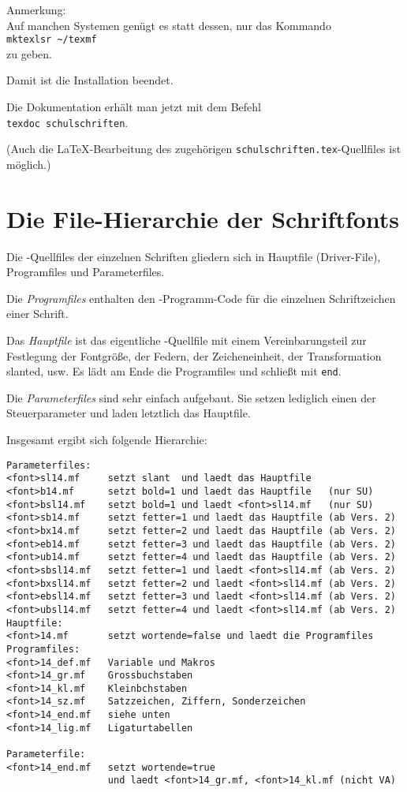 \documentclass[12pt,titlepage]{article}
\begin{document}
Anmerkung:\\
Auf manchen Systemen gen\"ugt es statt dessen, nur das Kommando\\
\verb+mktexlsr ~/texmf+\\
zu geben.

Damit ist die Installation beendet.

Die Dokumentation erh\"alt man jetzt mit dem Befehl\\
\verb+texdoc schulschriften+.

(Auch die \LaTeX-Bearbeitung des zugeh\"origen
\verb+schulschriften.tex+-Quellfiles 
ist m\"oglich.)

\section{Die File-Hierarchie der Schriftfonts}
Die \MF-Quellfiles der einzelnen Schriften gliedern sich in
Hauptfile (Driver-File), Programfiles und
Parameterfiles.

Die \emph{Programfiles} enthalten den \MF-Programm-Code
f\"ur die einzelnen Schriftzeichen einer Schrift.

Das \emph{Hauptfile} ist das eigentliche \MF-Quellfile mit
einem Vereinbarungsteil zur Festlegung der Fontgr\"o\ss{}e,
der Federn, der Zeicheneinheit, der Transformation slanted, usw.
Es l\"adt am Ende die Programfiles und schlie\ss{}t mit \verb+end+.

Die \emph{Parameterfiles} sind sehr einfach aufgebaut. Sie setzen
lediglich einen der Steuerparameter und laden letztlich das Hauptfile.

Insgesamt ergibt sich folgende Hierarchie:
\begin{verbatim}
Parameterfiles:
<font>sl14.mf     setzt slant  und laedt das Hauptfile    
<font>b14.mf      setzt bold=1 und laedt das Hauptfile   (nur SU) 
<font>bsl14.mf    setzt bold=1 und laedt <font>sl14.mf   (nur SU)
<font>sb14.mf     setzt fetter=1 und laedt das Hauptfile (ab Vers. 2) 
<font>bx14.mf     setzt fetter=2 und laedt das Hauptfile (ab Vers. 2)
<font>eb14.mf     setzt fetter=3 und laedt das Hauptfile (ab Vers. 2)
<font>ub14.mf     setzt fetter=4 und laedt das Hauptfile (ab Vers. 2)
<font>sbsl14.mf   setzt fetter=1 und laedt <font>sl14.mf (ab Vers. 2)
<font>bxsl14.mf   setzt fetter=2 und laedt <font>sl14.mf (ab Vers. 2)
<font>ebsl14.mf   setzt fetter=3 und laedt <font>sl14.mf (ab Vers. 2)
<font>ubsl14.mf   setzt fetter=4 und laedt <font>sl14.mf (ab Vers. 2)
Hauptfile:
<font>14.mf       setzt wortende=false und laedt die Programfiles
Programfiles:
<font>14_def.mf   Variable und Makros
<font>14_gr.mf    Grossbuchstaben
<font>14_kl.mf    Kleinbchstaben
<font>14_sz.mf    Satzzeichen, Ziffern, Sonderzeichen
<font>14_end.mf   siehe unten
<font>14_lig.mf   Ligaturtabellen

Parameterfile:
<font>14_end.mf   setzt wortende=true 
                  und laedt <font>14_gr.mf, <font>14_kl.mf (nicht VA)
\end{verbatim} 
\end{document}
